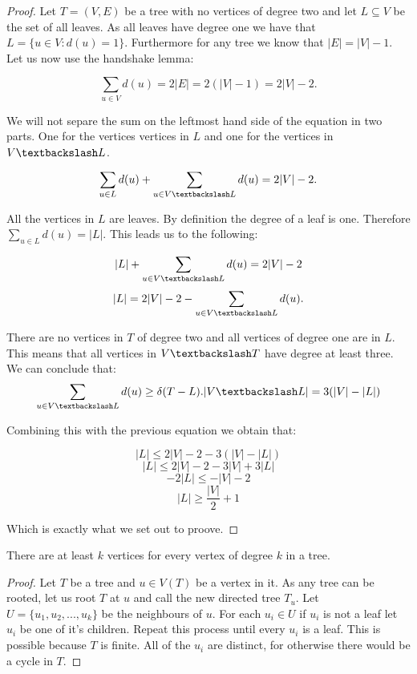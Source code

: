 \begin{proof}
    Let $T = (V, E)$ be a tree with no vertices of degree two and let $L \subseteq V$ be the set of all leaves. As all leaves have degree one we have that $L = \{u \in V: d(u) = 1\}$. Furthermore for any tree we know that $|E| = |V| - 1$. Let us now use the handshake lemma:

    $$ \sum_{u \in V}{d(u)} = 2|E| = 2(|V| - 1) = 2|V| - 2.$$

    We will not separe the sum on the leftmost hand side of the equation in two parts. One for the vertices vertices in $L$ and one for the vertices in $V\textbackslash L$.


    $$ \sum_{u \in L}{d(u)} + \sum_{u \in V\textbackslash L}{d(u)} = 2|V| - 2.$$

    All the vertices in $L$ are leaves. By definition the degree of a leaf is one. Therefore $\sum_{u \in L}{d(u)} = |L|$. This leads us to the following:

    $$  |L| + \sum_{u \in V\textbackslash L}{d(u)} = 2|V| - 2$$
    $$  |L|  = 2|V| - 2 - \sum_{u \in V\textbackslash L}{d(u)}.$$

    There are no vertices in $T$ of degree two and all vertices of degree one are in $L$. This means that all vertices in $V \textbackslash T$ have degree at least three. We can conclude that:
    $$\sum_{u \in V\textbackslash L}{d(u)} \ge \delta(T - L).|V\textbackslash L| = 3(|V| - |L|) $$

    Combining this with the previous equation we obtain that:

    $$  |L| \le 2|V| - 2 - 3(|V| - |L|)$$
    $$  |L| \le 2|V| - 2 - 3|V| + 3|L|$$
    $$  -2|L| \le -|V| - 2$$
    $$  |L| \ge \frac{|V|}{2} + 1$$

    Which is exactly what we set out to proove.


\end{proof}

\begin{lem} There are at least $k$ vertices for every vertex of degree $k$ in a tree. \end{lem}

\begin{proof}
    Let $T$ be a tree and $u \in V(T)$ be a vertex in it. As any tree can be rooted, let us root $T$ at $u$ and call the new directed tree $T_u$. Let $U = \{u_1, u_2, ..., u_k\}$ be the neighbours of $u$. For each $u_i \in U$ if $u_i$ is not a leaf let $u_i$ be one of it's children. Repeat this process until every $u_i$ is a leaf. This is possible because $T$ is finite. All of the $u_i$ are distinct, for otherwise there would be a cycle in $T$.
    
\end{proof}


